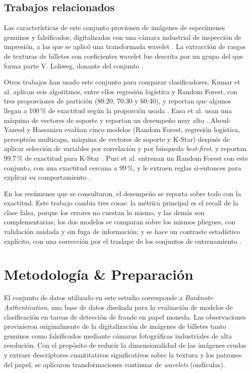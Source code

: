 \documentclass[conference]{IEEEtran}
\begin{document}
    \subsection{Trabajos relacionados}
    \label{sec:relacionados}
 
    Las características de este conjunto provienen de imágenes de especímenes genuinos y falsificados, digitalizadas con una cámara industrial de inspección de impresión, a las que se aplicó una transformada wavelet \cite{uci_banknote}. La extracción de rasgos de texturas de billetes con coeficientes wavelet fue descrita por un grupo del que forma parte V. Lohweg, donante del conjunto \cite{glock2009feature}.
 
    Otros trabajos han usado este conjunto para comparar clasificadores. Kumar et al. aplican seis algoritmos, entre ellos regresión logística y Random Forest, con tres proporciones de partición (80:20, 70:30 y 60:40), y reportan que algunos llegan a 100\,\% de exactitud según la proporción usada \cite{kumar2022fake}. 
    Easa et al. usan una máquina de vectores de soporte y reportan un desempeño muy alto \cite{easa2023fake}. Aboul-Yazeed y Hassanien evalúan cinco modelos (Random Forest, regresión logística, perceptrón multicapa, máquina de vectores de soporte y K-Star) después de aplicar selección de variables por correlación y por búsqueda \textit{best-first}, y reportan 99.7\,\% de exactitud para K-Star \cite{aboulyazeed2026enhanced}. Puri et al. entrenan un Random Forest con este conjunto, con una exactitud cercana a 99\,\%, y le extraen reglas si-entonces para explicar su comportamiento \cite{puri2017magix}.
 
    En los resúmenes que se consultaron, el desempeño se reporta sobre todo con la exactitud. Este trabajo cambia tres cosas: la métrica principal es el recall de la clase falsa, porque los errores no cuestan lo mismo, y las demás son complementarias; los dos modelos se comparan sobre los mismos pliegues, con validación anidada y sin fuga de información; y se hace un contraste estadístico explícito, con una corrección por el traslape de los conjuntos de entrenamiento \cite{nadeau2003inference}.

    
	\section{Metodología \& Preparación}
	El conjunto de datos utilizado en este estudio corresponde a \textit{Banknote Authentication}, una base de datos diseñada para la evaluación de modelos de clasificación en tareas de detección de fraude en papel moneda. Las observaciones provinieron originalmente de la digitalización de imágenes de billetes tanto genuinos como falsificados mediante cámaras fotográficas industriales de alta resolución. Con el propósito de reducir la dimensionalidad de las imágenes crudas y extraer descriptores cuantitativos significativos sobre la textura y los patrones del papel, se aplicaron transformaciones continuas de \textit{wavelets} (ondículas).
	
\end{document}
